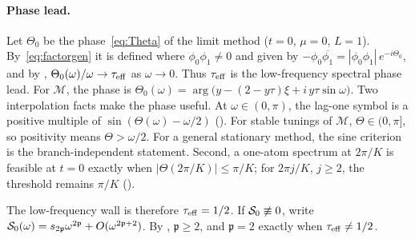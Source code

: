 \documentclass[11pt]{article}
\theoremstyle{definition}
\theoremstyle{remark}
\newcommand{\cM}{\mathcal M}
\newcommand{\teff}{\tau_{\rm eff}}
\begin{document}
\paragraph{Phase lead.}
Let \(\Theta_0\) be the phase~\eqref{eq:Theta} of the limit method (\(t=0\), \(\mu=0\), \(L=1\)).  By~\eqref{eq:factorgen} it is defined
where \(\phi_0\phi_1\ne0\) and given by \(-\phi_0\overline{\phi_1}=|\phi_0\phi_1|\,e^{-i\Theta_0}\), and
by , \(\Theta_0(\omega)/\omega\to\teff\) as \(\omega\to0\).
Thus \(\teff\) is the low-frequency spectral phase lead.
For \(\cM\), the phase is
\(\Theta_0(\omega)=\arg\bigl(y-(2-y\tau)\xi+i\,y\tau\sin\omega\bigr)\).
Two interpolation facts make the phase useful.  At \(\omega\in(0,\pi)\), the lag-one symbol is a positive
multiple of \(\sin(\Theta(\omega)-\omega/2)\) ().  For stable tunings of \(\cM\),
\(\Theta\in(0,\pi]\), so positivity means \(\Theta>\omega/2\).  For a general stationary method, the sine
criterion is the branch-independent statement.  Second, a one-atom spectrum at \(2\pi/K\) is feasible
at \(t=0\) exactly when \(|\Theta(2\pi/K)|\le\pi/K\); for \(2\pi j/K\), \(j\ge2\), the threshold remains
\(\pi/K\) ().

The low-frequency wall is therefore \(\teff=1/2\).
If \(\mathcal S_0\not\equiv0\), write
\(\mathcal S_0(\omega)=s_{2\mathfrak p}\omega^{2\mathfrak p}+O(\omega^{2\mathfrak p+2})\).
By , \(\mathfrak p\ge2\), and \(\mathfrak p=2\) exactly when \(\teff\ne1/2\).
\end{document}
